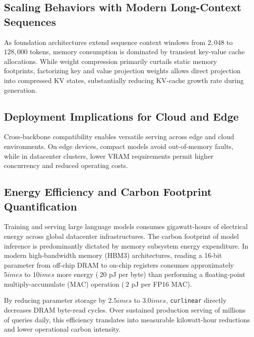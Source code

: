 \subsection{Scaling Behaviors with Modern Long-Context Sequences}
As foundation architectures extend sequence context windows from $2{,}048$ to $128{,}000$ tokens, memory consumption is dominated by transient key-value cache allocations. While weight compression primarily curtails static memory footprints, factorizing key and value projection weights allows direct projection into compressed KV states, substantially reducing KV-cache growth rate during generation.

\subsection{Deployment Implications for Cloud and Edge}
Cross-backbone compatibility enables versatile serving across edge and cloud environments. On edge devices, compact models avoid out-of-memory faults, while in datacenter clusters, lower VRAM requirements permit higher concurrency and reduced operating costs.

\subsection{Energy Efficiency and Carbon Footprint Quantification}
Training and serving large language models consumes gigawatt-hours of electrical energy across global datacenter infrastructures. The carbon footprint of model inference is predominantly dictated by memory subsystem energy expenditure. In modern high-bandwidth memory (HBM3) architectures, reading a 16-bit parameter from off-chip DRAM to on-chip registers consumes approximately $5	imes$ to $10	imes$ more energy ($~20$ pJ per byte) than performing a floating-point multiply-accumulate (MAC) operation ($~2$ pJ per FP16 MAC).

By reducing parameter storage by $2.5	imes$ to $3.0	imes$, \texttt{curlinear} directly decreases DRAM byte-read cycles. Over sustained production serving of millions of queries daily, this efficiency translates into measurable kilowatt-hour reductions and lower operational carbon intensity.
